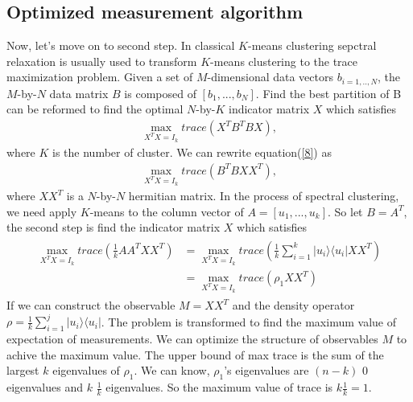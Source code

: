 \documentclass[onecolumn,notitlepage]{revtex4-1}
\def\ket#1{| #1 \rangle}
\def\bra#1{\langle #1 |}
\begin{document}
\subsection{Optimized measurement algorithm}
Now, let's move on to second step. In classical $K$-means clustering sepctral relaxation is usually used to transform $K$-means clustering to the trace maximization problem. Given a set of $M$-dimensional data vectors $b_{i=1,..,N}$, the $M$-by-$N$ data matrix $B$ is composed of $[b_{1},...,b_{N}]$. Find the best partition of B can be reformed to find the optimal $N$-by-$K$ indicator matrix $X$ which satisfies
\begin{align}
    \max_{X^TX=I_{k}} trace(X^TB^TBX),\label{8}
\end{align}
where $K$ is the number of cluster. We can rewrite equation(\ref{8}) as 
\begin{align}
    \max_{X^TX=I_{k}} trace(B^TBXX^T),
\end{align}
where $XX^T$ is a $N$-by-$N$ hermitian matrix. In the process of spectral clustering, we need apply $K$-means to the column vector of $A=[u_{1},...,u_{k}]$. So let $B=A^T$, the second step is find the indicator matrix $X$ which satisfies
\begin{align}
    \begin{split}
        \max_{X^TX=I_{k}} trace(\frac{1}{k}AA^TXX^T)&=\max_{X^TX=I_{k}} trace(\frac{1}{k}\sum_{i=1}^{k}\ket{u_{i}}\bra{u_{i}} XX^T)\\
        &=\max_{X^TX=I_{k}} trace(\rho_{1} XX^T)
    \end{split}
\end{align} 
If we can construct the observable $M=XX^T$ and the density operator $\rho = \frac{1}{k}\sum_{i=1}^{j}\ket{u_{i}}\bra{u_{i}}$. The problem is transformed to find the maximum value of expectation of measurements. We can optimize the structure of observables $M$ to achive the maximum value. The upper bound of max trace is the sum of the largest $k$ eigenvalues of $\rho_{1}$. We can know, $\rho_{1}$'s eigenvalues are $(n-k)$ 0 eigenvalues and $k$ $\frac{1}{k}$ eigenvalues. So the maximum value of trace is $k\frac{1}{k}=1$.
\end{document}
